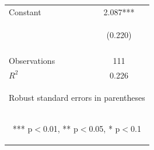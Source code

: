 \begin{center}
\begin{tabular}{lc}
Constant & 2.087*** \\
 & \begin{footnotesize}(0.220)\end{footnotesize} \\
\vspace{4pt} & \begin{footnotesize}\end{footnotesize} \\
Observations & 111 \\
 $R^2$ & 0.226 \\ \hline
\multicolumn{2}{c}{\begin{footnotesize} Robust standard errors in parentheses\end{footnotesize}} \\
\multicolumn{2}{c}{\begin{footnotesize} *** p$<$0.01, ** p$<$0.05, * p$<$0.1\end{footnotesize}} \\
\end{tabular}
\end{center}
